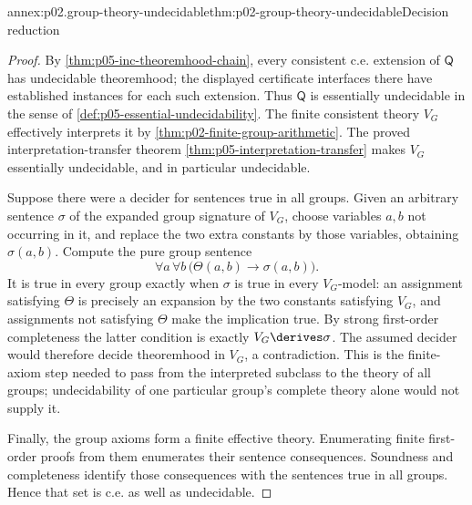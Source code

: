 \begin{annexitem}{annex:p02.group-theory-undecidable}{thm:p02-group-theory-undecidable}{Decision reduction}
\begin{proof}
By \cref{thm:p05-inc-theoremhood-chain}, every consistent c.e.
extension of \(\mathsf Q\) has undecidable theoremhood; the displayed
certificate interfaces there have established instances for each such
extension. Thus \(\mathsf Q\) is essentially undecidable in the sense
of \cref{def:p05-essential-undecidability}.
The finite consistent theory \(V_G\) effectively interprets it by
\cref{thm:p02-finite-group-arithmetic}. The proved interpretation-transfer
theorem \cref{thm:p05-interpretation-transfer} makes \(V_G\)
essentially undecidable, and in particular undecidable.

Suppose there were a decider for sentences true in all groups. Given
an arbitrary sentence \(\sigma\) of the expanded group signature of
\(V_G\), choose variables \(a,b\) not occurring in it, and replace the
two extra constants by those variables, obtaining \(\sigma(a,b)\).
Compute the pure group sentence
\[
 \forall a\,\forall b\,
       \bigl(\Theta(a,b)\to\sigma(a,b)\bigr).
\]
It is true in every group exactly when \(\sigma\) is true in every
\(V_G\)-model: an assignment satisfying \(\Theta\) is precisely an
expansion by the two constants satisfying \(V_G\), and assignments
not satisfying \(\Theta\) make the implication true. By strong
first-order completeness the latter condition is exactly
\(V_G\derives\sigma\). The assumed decider would therefore decide
theoremhood in \(V_G\), a contradiction. This is the finite-axiom
step needed to pass from the interpreted subclass to the theory of all
groups; undecidability of one particular group's complete theory alone
would not supply it.

Finally, the group axioms form a finite effective theory. Enumerating
finite first-order proofs from them enumerates their sentence
consequences. Soundness and completeness identify those consequences
with the sentences true in all groups. Hence that set is c.e. as well
as undecidable.
\end{proof}
\end{annexitem}
